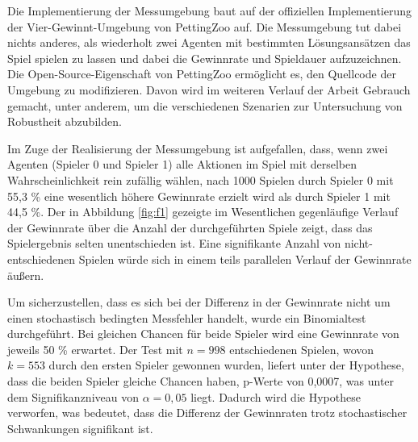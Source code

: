 
Die Implementierung der Messumgebung baut auf der offiziellen Implementierung der Vier-Gewinnt-Umgebung von PettingZoo auf. Die Messumgebung tut dabei nichts anderes, als wiederholt zwei Agenten mit bestimmten Lösungsansätzen das Spiel spielen zu lassen und dabei die Gewinnrate und Spieldauer aufzuzeichnen. Die Open-Source-Eigenschaft von PettingZoo ermöglicht es, den Quellcode der Umgebung zu modifizieren. Davon wird im weiteren Verlauf der Arbeit Gebrauch gemacht, unter anderem, um die verschiedenen Szenarien zur Untersuchung von Robustheit abzubilden.

Im Zuge der Realisierung der Messumgebung ist aufgefallen, dass, wenn zwei Agenten (Spieler 0 und Spieler 1) alle Aktionen im Spiel mit derselben Wahrscheinlichkeit rein zufällig wählen, nach 1000 Spielen durch Spieler 0 mit 55,3 \% eine wesentlich höhere Gewinnrate erzielt wird als durch Spieler 1 mit 44,5 \%. Der in Abbildung \ref{fig:f1} gezeigte im Wesentlichen gegenläufige Verlauf der Gewinnrate über die Anzahl der durchgeführten Spiele zeigt, dass das Spielergebnis selten unentschieden ist. Eine signifikante Anzahl von nicht-entschiedenen Spielen würde sich in einem teils parallelen Verlauf der Gewinnrate äußern.

Um sicherzustellen, dass es sich bei der Differenz in der Gewinnrate nicht um einen stochastisch bedingten Messfehler handelt, wurde ein Binomialtest durchgeführt. Bei gleichen Chancen für beide Spieler wird eine Gewinnrate von jeweils 50 \% erwartet. Der Test mit $n = 998$ entschiedenen Spielen, wovon $k = 553$ durch den ersten Spieler gewonnen wurden, liefert unter der Hypothese, dass die beiden Spieler gleiche Chancen haben, p-Werte von 0,0007, was unter dem Signifikanzniveau von $\alpha = 0,05$ liegt. Dadurch wird die Hypothese verworfen, was bedeutet, dass die Differenz der Gewinnraten trotz stochastischer Schwankungen signifikant ist.

